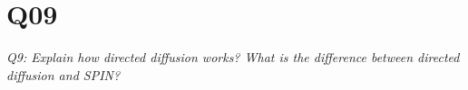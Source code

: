 \chapter{Q09}
\emph{Q9: Explain how directed diffusion works? What is the difference between
directed diffusion and SPIN?}

